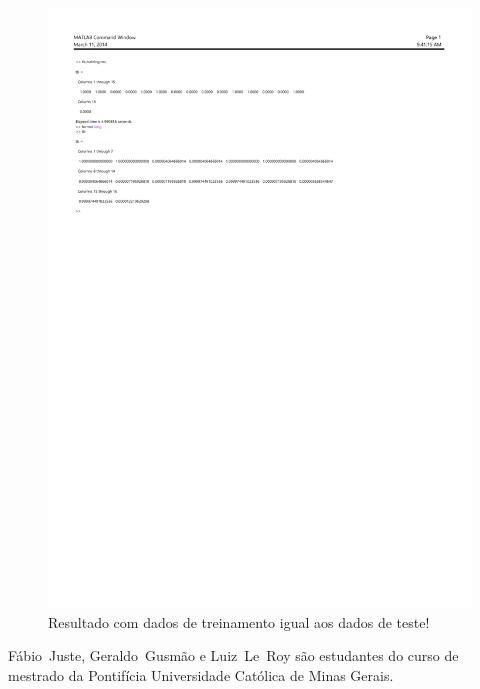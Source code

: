 \documentclass{IEEEtran}
\begin{document}
\begin{figure}[ht!]
	\centering
	\includegraphics{resultMat.pdf}
	\caption{Resultado com dados de treinamento igual aos dados de teste!}
	\label{resultMat}
\end{figure}


\ifCLASSOPTIONcaptionsoff
  \newpage
\fi




\begin{IEEEbiographynophoto}{Fábio~Juste, Geraldo~Gusmão e Luiz~Le~Roy}
são estudantes do curso de mestrado da Pontif\'icia Universidade Cat\'olica de Minas Gerais.
\end{IEEEbiographynophoto}

\end{document}
